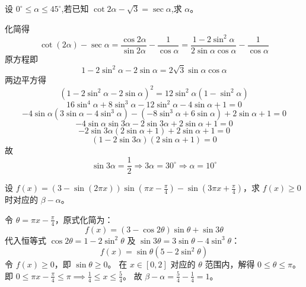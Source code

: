 \begin{questions}
    \question 设 $0^\circ \le \alpha \le 45^\circ$,若已知 $\cot 2\alpha - \sqrt{3} = \sec \alpha$,求 $\alpha$。
    \begin{solution}
        化简得
        \[
        \cot(2\alpha) - \sec \alpha 
        = \frac{\cos 2\alpha}{\sin 2\alpha} - \frac{1}{\cos \alpha} 
        = \frac{1-2\sin^2\alpha}{2\sin \alpha\cos \alpha} - \frac{1}{\cos \alpha}
        \]
        原方程即
        \[
        1 - 2\sin^2\alpha - 2\sin\alpha = 2\sqrt{3} \sin \alpha \cos \alpha 
        \]
        两边平方得
        \[
        (1 - 2\sin^2\alpha - 2\sin\alpha)^2 = 12\sin^2\alpha(1-\sin^2\alpha)
        \]
        \[
        16\sin^4\alpha + 8\sin^3\alpha - 12\sin^2\alpha - 4\sin\alpha + 1 = 0
        \]
        \[
        -4\sin\alpha(3\sin\alpha - 4\sin^3\alpha) - (-8\sin^3\alpha + 6\sin\alpha) + 2\sin\alpha + 1 = 0
        \]
        \[
        -4\sin\alpha \sin 3\alpha - 2\sin 3\alpha + 2\sin\alpha + 1 = 0
        \]
        \[
        -2\sin 3\alpha (2\sin\alpha + 1) + 2\sin\alpha + 1 = 0
        \]
        \[
        (1 - 2\sin 3\alpha)(2\sin\alpha + 1) = 0
        \]
        故
        \[
        \sin 3\alpha = \frac{1}{2} \Rightarrow 3\alpha = 30^\circ \Rightarrow \alpha = 10^\circ
        \]
    \end{solution}

    \question
设 $f(x) = (3 - \sin(2\pi x)) \sin\left(\pi x - \frac{\pi}{4}\right) - \sin\left(3\pi x + \frac{\pi}{4}\right)$，求 $f(x) \ge 0$ 时对应的 $\beta - \alpha$。

\begin{solution}
令 $\theta = \pi x - \frac{\pi}{4}$，原式化简为：
\[ f(x) = (3 - \cos 2\theta) \sin \theta + \sin 3\theta \]
代入恒等式 $\cos 2\theta = 1 - 2\sin^2 \theta$ 及 $\sin 3\theta = 3\sin \theta - 4\sin^3 \theta$：
\[ f(x) = \sin \theta (5 - 2\sin^2 \theta) \]
令 $f(x) \ge 0$，即 $\sin \theta \ge 0$。
在 $x \in [0, 2]$ 对应的 $\theta$ 范围内，解得 $0 \le \theta \le \pi$。
即 $0 \le \pi x - \frac{\pi}{4} \le \pi \implies \frac{1}{4} \le x \le \frac{5}{4}$。
故 $\beta - \alpha = \frac{5}{4} - \frac{1}{4} = 1$。
\end{solution}

    \question 
    \begin{parts}

\end{parts}
\end{questions}
